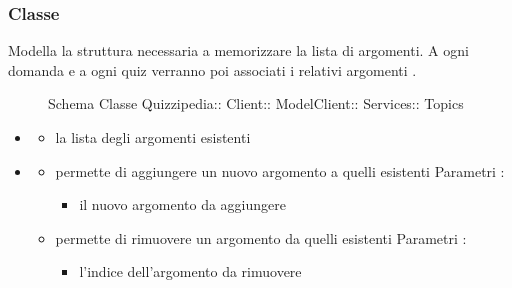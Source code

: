 \subsubsection{Classe }
Modella la struttura necessaria a memorizzare la lista di argomenti. A ogni domanda e a ogni quiz verranno poi associati i relativi argomenti .
\begin{figure}[H]
\centering
\noindent{}
\caption[Schema Classe Topics]{Schema Classe Quizzipedia:: Client:: ModelClient:: Services:: Topics}
\end{figure}
\begin{itemize}
\item {}
\begin{itemize}
\item {}
\newline
la lista degli argomenti esistenti
\end{itemize}
\item {}
\begin{itemize}
\item {}
\newline
permette di aggiungere un nuovo argomento a quelli esistenti
\newline
Parametri :
\begin{itemize}
\item {}
\newline
il nuovo argomento da aggiungere
\end{itemize}
\item {}
\newline
permette di rimuovere un argomento da quelli esistenti
\newline
Parametri :
\begin{itemize}
\item {}
\newline
l'indice dell'argomento da rimuovere
\end{itemize}
\end{itemize}
\end{itemize}
